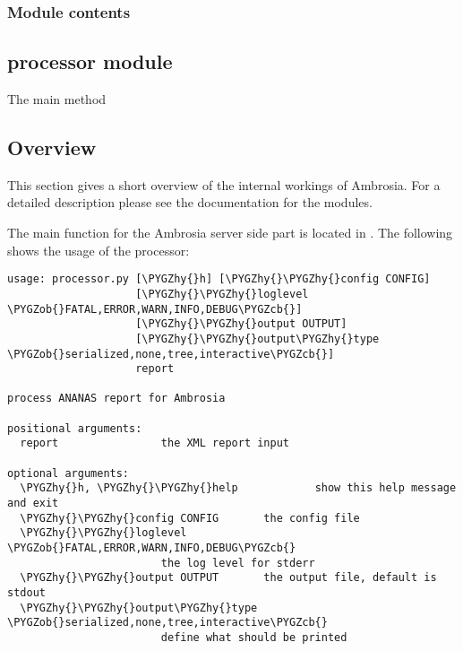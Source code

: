 \documentclass[letterpaper,10pt,english]{sphinxmanual}
\def\PYGZob{\char`\{}
\def\PYGZcb{\char`\}}
\def\PYGZhy{\char`\-}
\begin{document}
\subsubsection{Module contents}
\label{ambrosia_plugins:module-ambrosia_plugins}\label{ambrosia_plugins:module-contents}

\subsection{processor module}
\label{processor:module-processor}\label{processor::doc}\label{processor:processor-module}

\begin{fulllineitems}
\label{processor:processor.main}
The main method

\end{fulllineitems}



\subsection{Overview}
\label{server:overview}
This section gives a short overview of the internal workings of Ambrosia. For a detailed description please see the
documentation for the modules.

The main function for the Ambrosia server side part is located in {\hyperref[processor:module-processor]{}}. The following shows the usage
of the processor:

\begin{Verbatim}[commandchars=\\\{\}]
usage: processor.py [\PYGZhy{}h] [\PYGZhy{}\PYGZhy{}config CONFIG]
                    [\PYGZhy{}\PYGZhy{}loglevel \PYGZob{}FATAL,ERROR,WARN,INFO,DEBUG\PYGZcb{}]
                    [\PYGZhy{}\PYGZhy{}output OUTPUT]
                    [\PYGZhy{}\PYGZhy{}output\PYGZhy{}type \PYGZob{}serialized,none,tree,interactive\PYGZcb{}]
                    report

process ANANAS report for Ambrosia

positional arguments:
  report                the XML report input

optional arguments:
  \PYGZhy{}h, \PYGZhy{}\PYGZhy{}help            show this help message and exit
  \PYGZhy{}\PYGZhy{}config CONFIG       the config file
  \PYGZhy{}\PYGZhy{}loglevel \PYGZob{}FATAL,ERROR,WARN,INFO,DEBUG\PYGZcb{}
                        the log level for stderr
  \PYGZhy{}\PYGZhy{}output OUTPUT       the output file, default is stdout
  \PYGZhy{}\PYGZhy{}output\PYGZhy{}type \PYGZob{}serialized,none,tree,interactive\PYGZcb{}
                        define what should be printed
\end{Verbatim}
\end{document}
